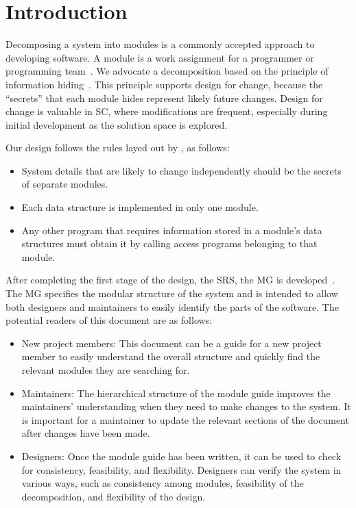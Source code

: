 \documentclass[12pt, titlepage]{article}
\begin{document}
\newpage

\tableofcontents

\listoftables

\listoffigures

\newpage


\section{Introduction}

Decomposing a system into modules is a commonly accepted approach to developing
software.  A module is a work assignment for a programmer or programming
team~\citep{ParnasEtAl1984}.  We advocate a decomposition
based on the principle of information hiding~\citep{Parnas1972a}.  This
principle supports design for change, because the ``secrets'' that each module
hides represent likely future changes.  Design for change is valuable in SC,
where modifications are frequent, especially during initial development as the
solution space is explored.  

Our design follows the rules layed out by \citet{ParnasEtAl1984}, as follows:
\begin{itemize}
\item System details that are likely to change independently should be the
  secrets of separate modules.
\item Each data structure is implemented in only one module.
\item Any other program that requires information stored in a module's data
  structures must obtain it by calling access programs belonging to that module.
\end{itemize}

After completing the first stage of the design, the SRS, the MG is developed~\citep{ParnasEtAl1984}. The MG
specifies the modular structure of the system and is intended to allow both
designers and maintainers to easily identify the parts of the software.  The
potential readers of this document are as follows:

\begin{itemize}
\item New project members: This document can be a guide for a new project member
  to easily understand the overall structure and quickly find the
  relevant modules they are searching for.
\item Maintainers: The hierarchical structure of the module guide improves the
  maintainers' understanding when they need to make changes to the system. It is
  important for a maintainer to update the relevant sections of the document
  after changes have been made.
\item Designers: Once the module guide has been written, it can be used to
  check for consistency, feasibility, and flexibility. Designers can verify the
  system in various ways, such as consistency among modules, feasibility of the
  decomposition, and flexibility of the design.
\end{itemize}
\end{document}

